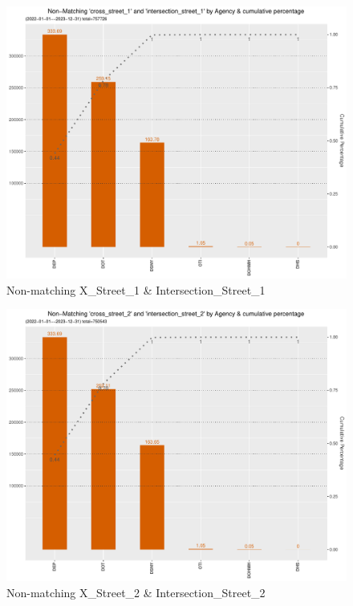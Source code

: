 \documentclass[12pt, titlepage]{article}
\begin{document}
{	\begin{figure}[tbp]
		\centering
		\includegraphics[width = \textwidth]
		{non-matchingcross_street_1andintersection_street_1.pdf}
		\caption{Non-matching X\_Street\_1 \& Intersection\_Street\_1}
		\label{fig:xstreet1}
	\end{figure}	

	\begin{figure}[tbp]
		\centering
		\includegraphics[width = \textwidth]
		{non-matchingcross_street_2andintersection_street_2.pdf}
		\caption{Non-matching X\_Street\_2 \& Intersection\_Street\_2}
		\label{fig:xstreet2}
	\end{figure}	

}
\end{document}
